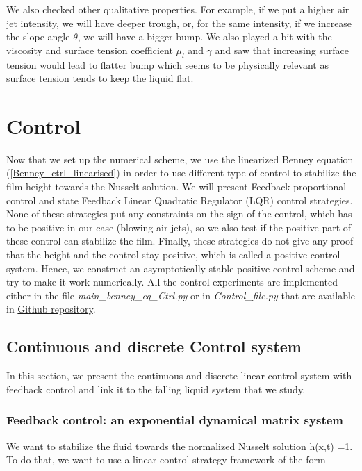 \documentclass[12pt]{article}
\begin{document}
We also checked other qualitative properties. For example, if we put a higher air jet intensity, we will have deeper trough, or, for the same intensity, if we increase the slope angle $\theta$, we will have a bigger bump. We also played a bit with the viscosity and surface tension coefficient $\mu_l$ and $\gamma$ and saw that increasing surface tension would lead to flatter bump which seems to be physically relevant as surface tension tends to keep the liquid flat.





\newpage
\section{Control}\label{Section_Control}
Now that we set up the numerical scheme, we use the linearized Benney equation (\ref{Benney_ctrl_linearised}) in order to use different type of control to stabilize the film height towards the Nusselt solution. We will present Feedback proportional control and state Feedback Linear Quadratic Regulator (LQR) control strategies. None of these strategies 
put any constraints on the sign of the control, which has to be positive in our case (blowing air jets), so we also test if the positive part of 
these control can stabilize the film. Finally, these strategies do not give any proof that the height and the control stay positive, which is called a positive
control system. Hence, we construct an asymptotically stable positive control scheme and try to make it work numerically. All the control experiments
are implemented either in the file \textit{main\_benney\_eq\_Ctrl.py} or in \textit{Control\_file.py} that are available in \href{https://github.com/Bilal59170/Repo_Warwick_internship}{Github repository}.


\subsection{Continuous and discrete Control system }
In this section, we present the continuous and discrete linear control system with feedback control and link it to the falling liquid system that we study.

\subsubsection{Feedback control: an exponential dynamical matrix system}
We want to stabilize the fluid towards the normalized Nusselt solution h(x,t) =1. To do that, we want to use a linear control strategy framework of the form
\end{document}
